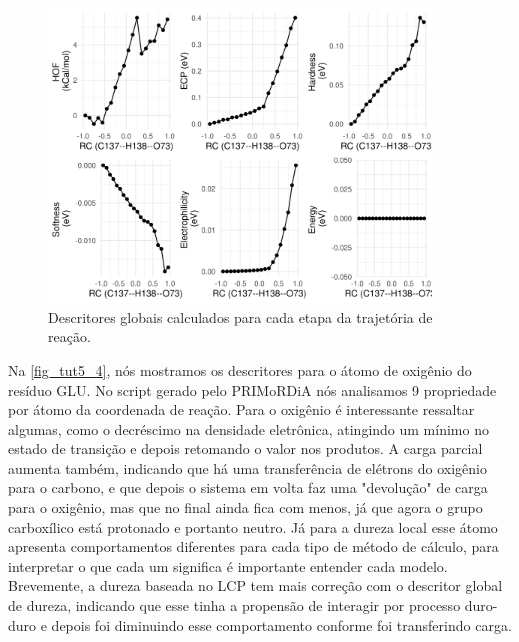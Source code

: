 \documentclass[a4paper,11pt]{refart}
\begin{document}
	 \hspace*{-\leftmarginwidth}
	 \begin{minipage}{\fullwidth}
	 	\begin{figure}[H]
	 		\begin{center}
	 			\includegraphics[width=4in]{global_rc1}
	 			\caption{Descritores globais calculados para cada etapa da trajetória de reação.}
	 			\label{fig_tut5_2}
	 		\end{center}
	 	\end{figure}
	 \end{minipage}
	 	 
	 	 
	 Na \autoref{fig_tut5_4}, nós mostramos os descritores para o átomo de oxigênio do resíduo GLU. No script gerado pelo PRIMoRDiA nós analisamos 9 propriedade por átomo da coordenada de reação. Para o oxigênio é interessante ressaltar algumas, como o decréscimo na densidade eletrônica, atingindo um mínimo no estado de transição e depois retomando o valor nos produtos. A carga parcial aumenta também, indicando que há uma transferência de elétrons do oxigênio para o carbono, e que depois o sistema em volta faz uma "devolução" de carga para o oxigênio, mas que no final ainda fica com menos, já que agora o grupo carboxílico está protonado e portanto neutro. Já para a dureza local esse átomo apresenta comportamentos diferentes para cada tipo de método de cálculo, para interpretar o que cada um significa é importante entender cada modelo. Brevemente, a dureza baseada no LCP tem mais correção com o descritor global de dureza, indicando que esse tinha a propensão de interagir por processo duro-duro e depois foi diminuindo esse comportamento conforme foi transferindo carga. 
	 
\end{document}
